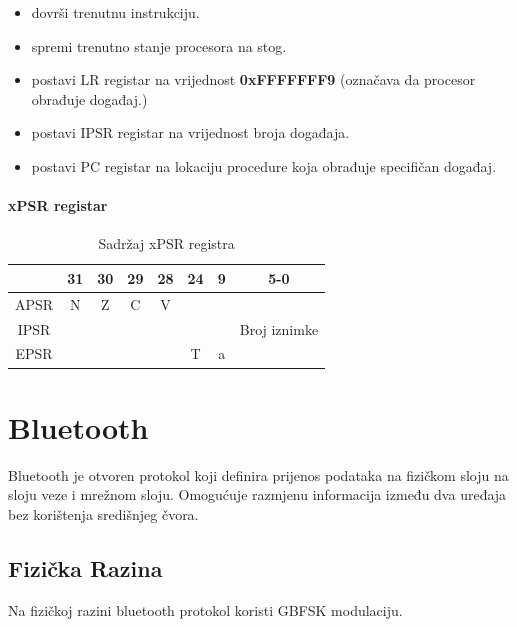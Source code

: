 \documentclass[times, utf8, diplomski]{diplomski}
\begin{document}
\begin{itemize}
  \item dovrši trenutnu instrukciju.
  \item spremi trenutno stanje procesora na stog.
  \item postavi LR registar na vrijednost \textbf{0xFFFFFFF9} (označava da procesor obrađuje događaj.)
  \item postavi IPSR registar na vrijednost broja događaja.
  \item postavi PC registar na lokaciju procedure koja obrađuje specifičan događaj.
\end{itemize}

\subsubsection{xPSR registar}

\begin{table}[H]
  \begin{center}
    \begin{tabular}{c|c|c|c|c||c||c||c|}
      \cline{2-8} & 31 & 30 & 29 & 28 & 24 & 9 & 5-0\\
      \hline
      \multicolumn{1}{|c|}{APSR} & N & Z & C & V & \multicolumn{3}{c|}{ } \\
      \hline
      \multicolumn{1}{|c|}{IPSR} & \multicolumn{6}{c||}{ } & Broj iznimke \\
      \hline
      \multicolumn{1}{|c|}{EPSR} & \multicolumn{4}{c||}{ } & T & a & \\
      \hline
    \end{tabular}
    \caption{Sadržaj xPSR registra}
  \end{center}
\end{table}

\newpage

\chapter{Bluetooth}

Bluetooth \cite{core41} je otvoren protokol koji definira prijenos podataka na fizičkom sloju na sloju veze i mrežnom sloju. Omogućuje razmjenu informacija između dva uređaja bez korištenja središnjeg čvora.

\section {Fizička Razina}
Na fizičkoj razini bluetooth protokol koristi GBFSK \cite{GBFSK} modulaciju.
\end{document}
